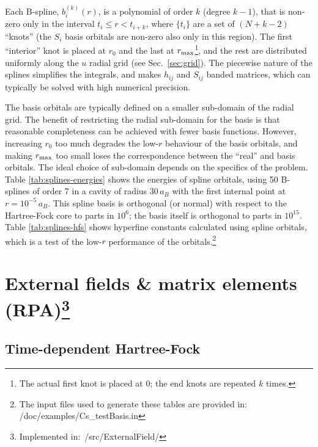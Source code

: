 \documentclass[10pt,twocolumn,a4paper]{article}%
\begin{document}
Each B-spline, $b_i^{(k)}(r)$, is a polynomial of order $k$ (degree $k-1$), that is non-zero only in the interval $t_i\leq r<t_{i+k}$, where $\{t_i\}$ are a set of $(N+k-2)$ ``knots'' (the $S_i$ basis orbitals are non-zero also only in this region).
The first ``interior'' knot is placed at $r_0$ and the last at $r_{\rm max}$\footnote{The actual first knot is placed at 0; the end knots are repeated $k$ times.}, and the rest are distributed uniformly along the $u$ radial grid (see Sec.~\ref{sec:grid}).
The piecewise nature of the splines simplifies the integrals, and makes $h_{ij}$ and $S_{ij}$ banded matrices, which can typically be solved with high numerical precision.


The basis orbitals are typically defined on a smaller sub-domain of the radial grid.
The benefit of restricting the radial sub-domain for the basis is that reasonable completeness can be achieved with fewer basis functions.
However, increasing $r_0$ too much degrades the low-$r$ behaviour of the basis orbitals, and making $r_{\rm max}$ too small loses the correspondence between the ``real'' and basis orbitals.
The ideal choice of sub-domain depends on the specifics of the problem.
%
Table \ref{tab:splines-energies} shows the energies of spline orbitals, using 50 B-splines of order 7 in a cavity of radius 30\,$a_B$ with the first internal point at $r=10^{-5}\,a_B$.
This spline basis is orthogonal (or normal) with respect to the Hartree-Fock core to parts in $10^6$; the basis itself is orthogonal to parts in $10^{15}$.
Table \ref{tab:splines-hfs} shows hyperfine constants calculated using spline orbitals, which is a test of the low-$r$ performance of the orbitals.\footnote{The input files used to generate these tables are provided in: /doc/examples/Cs\_testBasis.in}











\section[External fields \& matrix elements (RPA)]{External fields \& matrix elements (RPA)\footnote{Implemented in:~/src/ExternalField/}}

\subsection{Time-dependent Hartree-Fock}\label{sec:tdhf}
\end{document}
